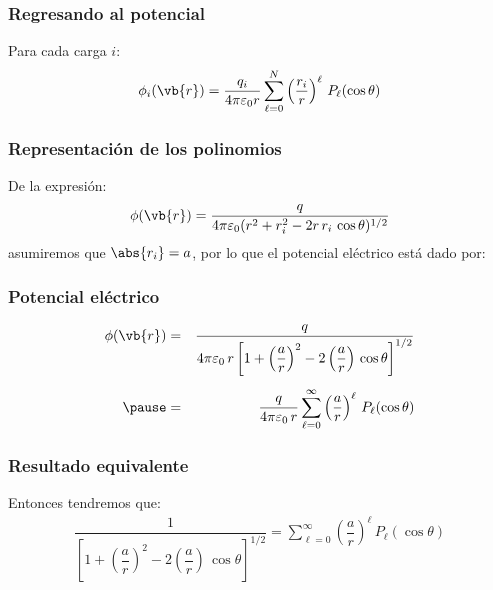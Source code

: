 \begin{frame}
\frametitle{Regresando al potencial}
Para cada carga $i$:
\begin{align*}
\phi_{i} (\vb{r}) = \dfrac{q_{i}}{4 \pi \varepsilon_{0} r} \sum_{\ell=0}^{N} \left( \dfrac{r_{i}}{r} \right)^{\ell} \, P_{\ell} (\cos \theta)
\end{align*}
\end{frame}
\begin{frame}
\frametitle{Representación de los polinomios}
De la expresión:
\begin{align*}
\phi(\vb{r}) = \dfrac{q}{4 \pi \varepsilon_{0} (r^{2} + r_{i}^{2} - 2 r \, r_{i} \, \cos \theta)^{1/2}}
\end{align*}
\pause
asumiremos que $\abs{r_{i}} = a$, por lo que el potencial eléctrico está dado por:
\end{frame}
\begin{frame}
\frametitle{Potencial eléctrico}
\begin{eqnarray*}
\phi(\vb{r}) &=& \dfrac{q}{4 \pi \varepsilon_{0} \, r \left[ 1 + \left( \dfrac{a}{r} \right)^{2} - 2 \left( \dfrac{a}{r} \right) \, \cos \theta \right]^{1/2}} \\[0.5em] \pause
&=& \dfrac{q}{4 \pi \varepsilon_{0} \, r} \sum_{\ell=0}^{\infty} \left( \dfrac{a}{r} \right)^{\ell} \, P_{\ell} (\cos \theta)
\end{eqnarray*}
\end{frame}
\begin{frame}
\frametitle{Resultado equivalente}
Entonces tendremos que:
\begin{align*}
\dfrac{1}{\left[ 1 + \left( \dfrac{a}{r} \right)^{2} - 2 \left( \dfrac{a}{r} \right) \, \cos \theta \right]^{1/2}} = \sum_{\ell=0}^{\infty} \left( \dfrac{a}{r} \right)^{\ell} \, P_{\ell} (\cos \theta)
\end{align*}
\end{frame}
